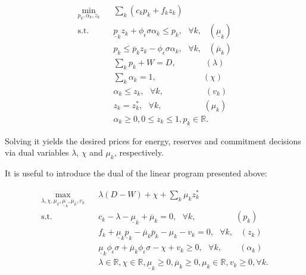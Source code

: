 \documentclass{article}
\begin{document}
\begin{align}
\underset{p_k, \alpha_k, z_k}{\min} \hspace{10pt} & \sum_k (c_k p_k + f_k z_k)\\
\mbox{s.t. } & \underline{p}_k z_k + \phi_{\epsilon} \sigma \alpha_k \le p_k, \mbox{ }\forall k, \hspace{10pt} (\underline{\mu}_k)\\
& p_k \le \overline{p}_k z_k - \phi_{\epsilon} \sigma \alpha_k, \mbox{ }\forall k, \hspace{10pt} (\overline{\mu}_k) \\
& \sum_k p_k + W = D,\hspace{42pt} (\lambda)\\
& \sum_k \alpha_k = 1,\hspace{67pt} (\chi) \\
& \alpha_k \le z_k, \mbox{ }\forall k, \hspace{60pt} (v_k) \\
& z_k = z_k^*, \mbox{ } \forall k, \hspace{60pt} (\mu_k)\\
& \alpha_k \ge 0, 0 \le z_k \le 1, p_k \in \mathbb{R}.
\end{align}

Solving it yields the desired prices for energy, reserves and commitment decisions via dual variables $\lambda$, $\chi$ and $\mu_k$, respectively.

It is useful to introduce the dual of the linear program presented above:

\begin{align}
\underset{\lambda, \chi, \mu_k, \underline{\mu}_k, \overline{\mu}_k, v_k} \max \hspace{10pt} & \lambda(D - W) + \chi + \sum_k \mu_k z_k^* \\
\mbox{s.t. } & c_k - \lambda - \underline{\mu}_k + \overline{\mu}_k = 0, \mbox{ }\forall k, \hspace{57pt} (p_k)\\
& f_k + \underline{\mu}_k \underline{p}_k - \overline{\mu}_k \overline{p}_k - \mu_k - v_k = 0, \mbox{ }\forall k, \hspace{10pt} (z_k) \\
& \underline{\mu}_k \phi_{\epsilon} \sigma + \overline{\mu}_k \phi_{\epsilon} \sigma - \chi + v_k \ge 0, \mbox{ } \forall k, \hspace{25pt} (\alpha_k)\\
& \lambda \in \mathbb{R}, \chi \in \mathbb{R}, \underline{\mu}_k \ge 0, \overline{\mu}_k \ge 0, \mu_k \in \mathbb{R}, v_k \ge 0, \forall k.
\end{align}
\end{document}
